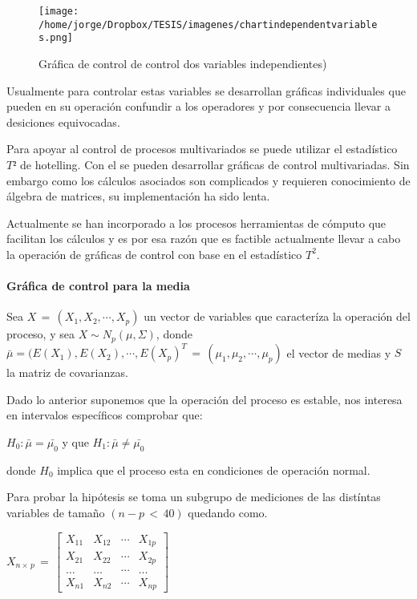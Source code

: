 \documentclass[english]{report}
\begin{document}
\begin{figure}[H]
\centering
\texttt{[image: /home/jorge/Dropbox/TESIS/imagenes/chartindependentvariables.png]}
\caption{Gráfica de control de control dos variables independientes) }
\label{c2f7}
\end{figure}

Usualmente para controlar estas variables se desarrollan gráficas individuales que pueden en su operación confundir a los operadores y por consecuencia llevar a desiciones equivocadas.

Para apoyar al control de procesos multivariados se puede utilizar el estadístico $T²$ de hotelling. Con el se pueden desarrollar gráficas de control multivariadas. Sin embargo como los cálculos asociados son complicados y requieren conocimiento de álgebra de matrices, su implementación ha sido lenta.

Actualmente se han incorporado a los procesos herramientas de cómputo que facilitan los cálculos y es por esa razón que es factible actualmente llevar a cabo la operación de gráficas de control con base en el estadístico $T^2$.

\paragraph{Gráfica de control para la media}

Sea $X\,=\,(X_1,X_2,\cdots,X_p)$ un vector de variables que caracteríza la operación del proceso, y sea $X\sim N_p(\mu,\Sigma)$, donde $\bar{\mu}=(E(X_1),E(X_2),\cdots,E(X_p)^T\,=\,(\mu_1,\mu_2,\cdots,\mu_p)$ el vector de medias y $S$ la matriz de covarianzas.

Dado lo anterior suponemos que la operación del proceso es estable, nos interesa en intervalos específicos comprobar que:

$H_0:\bar{\mu}=\bar{\mu_0}$ y que $H_1:\bar{\mu} \neq \bar{\mu_0}$ 

donde $H_0$ implica que el proceso esta en condiciones de operación normal.

Para probar la hipótesis se toma un subgrupo de mediciones de las distíntas variables de tamaño $(n-p\, <\, 40)$ quedando como.

\vspace{15pt}

$X_{n\times\,p}\,=\,
\begin{bmatrix}
X_{11}&X_{12}&\cdots&X_{1p}\\
X_{21}&X_{22}&\cdots&X_{2p}\\
\hdots&\hdots&\cdots&\hdots\\
X_{n1}&X_{n2}&\cdots&X_{np}
\end{bmatrix}$
\end{document}
